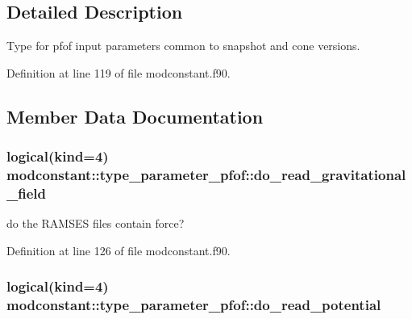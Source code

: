 \subsection{Detailed Description}
Type for pfof input parameters common to snapshot and cone versions. 

Definition at line 119 of file modconstant.\-f90.



\subsection{Member Data Documentation}
\hypertarget{structmodconstant_1_1type__parameter__pfof_aa8c19ebe7cca7545effc17c2162557cb}{
\subsubsection[{do\-\_\-read\-\_\-gravitational\-\_\-field}]{\setlength{\rightskip}{0pt plus 5cm}logical(kind=4) modconstant\-::type\-\_\-parameter\-\_\-pfof\-::do\-\_\-read\-\_\-gravitational\-\_\-field}}\label{structmodconstant_1_1type__parameter__pfof_aa8c19ebe7cca7545effc17c2162557cb}


do the R\-A\-M\-S\-E\-S files contain force? 



Definition at line 126 of file modconstant.\-f90.

\hypertarget{structmodconstant_1_1type__parameter__pfof_aba812b01af16a40aa26a33136619786a}{
\subsubsection[{do\-\_\-read\-\_\-potential}]{\setlength{\rightskip}{0pt plus 5cm}logical(kind=4) modconstant\-::type\-\_\-parameter\-\_\-pfof\-::do\-\_\-read\-\_\-potential}}\label{structmodconstant_1_1type__parameter__pfof_aba812b01af16a40aa26a33136619786a}


